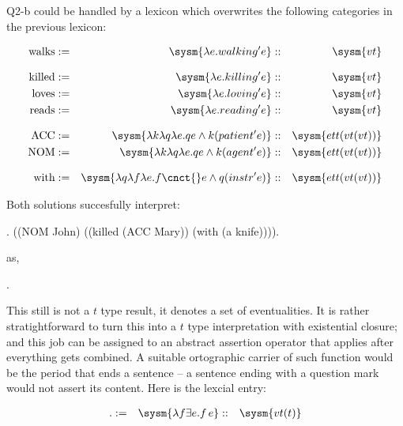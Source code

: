 \documentclass[10pt,a4paper]{exam}
\begin{document}
Q2-b could be handled by a lexicon which overwrites the following categories in the previous lexicon:


\begin{ulexicon}

\begin{align*}
	\text{walks}   &:=& \sysm{\lambda e.walking'e}  &::& \sysm{vt}\\[8pt]
	\text{killed}  &:=& \sysm{\lambda e.killing' e}   &::& \sysm{vt}\\
	\text{loves}   &:=& \sysm{\lambda e.loving' e}   &::& \sysm{vt}\\
	\text{reads}   &:=& \sysm{\lambda e.reading' e}   &::& \sysm{vt}\\[8pt]
	\text{ACC}     &:=& \sysm{\lambda k\lambda q\lambda e.q e \land k (patient' e)} &::& \sysm{ett(vt(vt))}\\
	\text{NOM}     &:=& \sysm{\lambda k\lambda q\lambda e.q e \land k (agent' e)} &::& \sysm{ett(vt(vt))}\\[8pt]
	\text{with}    &:=& \sysm{\lambda q\lambda f \lambda e.f\cnct{} e \land q (instr' e)} &::& \sysm{ett(vt(vt))}\\
\end{align*}

\end{ulexicon}

Both solutions succesfully interpret:

\ex. ((NOM John) ((killed (ACC Mary)) (with (a knife)))).

as,

\ex. 


This still is not a $t$ type result, it denotes a set of eventualities. It is rather stratightforward to turn this into a $t$ type interpretation with existential closure; and this job can be assigned to an abstract assertion operator that applies after everything gets combined. A suitable ortographic carrier of such function would be the period that ends a sentence -- a sentence ending with a question mark would not assert its content. Here is the lexcial entry:

\begin{ulexicon}

\begin{align*}
	\text{.}    &:=& \sysm{\lambda f \exists e.f\, e} &::& \sysm{vt(t)}\\
\end{align*}

\end{ulexicon}
\end{document}
